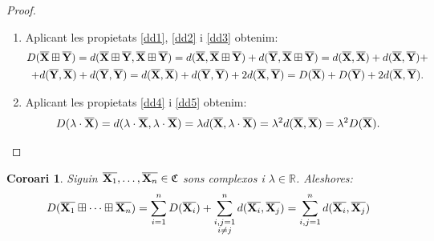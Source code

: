 \documentclass{article}
\theoremstyle{math}
\newtheorem{corollary}[definition]{Coro\lgem ari}
\newcommand{\0}{\ensuremath{\vb{0}}}
\newcommand{\X}{\ensuremath{\vb{X}}}
\newcommand{\Y}{\ensuremath{\vb{Y}}}
\newcommand{\RR}{\ensuremath{\mathbb{R}}} %
\begin{document}
\begin{proof}
    \hfill
    \begin{enumerate}[label=$D$\arabic*)]
        \item Aplicant les propietats \ref{dd1}, \ref{dd2} i \ref{dd3} obtenim:
        \begin{multline*}
            D(\overline{\X}\boxplus\overline{\Y})=d(\overline{\X}\boxplus\overline{\Y},\overline{\X}\boxplus\overline{\Y})=d(\overline{\X},\overline{\X}\boxplus\overline{\Y})+d(\overline{\Y},\overline{\X}\boxplus\overline{\Y})=d(\overline{\X},\overline{\X})+d(\overline{\X},\overline{\Y})+\\+d(\overline{\Y},\overline{\X})+d(\overline{\Y},\overline{\Y})=d(\overline{\X},\overline{\X})+d(\overline{\Y},\overline{\Y})+2d(\overline{\X},\overline{\Y})=D(\overline{\X})+D(\overline{\Y})+2d(\overline{\X},\overline{\Y}).
        \end{multline*}
        \item Aplicant les propietats \ref{dd4} i \ref{dd5} obtenim: $$D(\lambda\cdot\overline{\X})=d(\lambda\cdot\overline{\X},\lambda\cdot\overline{\X})=\lambda d(\overline{\X},\lambda\cdot\overline{\X})=\lambda^2d(\overline{\X},\overline{\X})=\lambda^2D(\overline{\X}).$$
    \end{enumerate}
\end{proof}
\begin{corollary}
    Siguin $\overline{\X_1},\ldots,\overline{\X_n}\in\mathfrak{C}$ sons complexos i $\lambda\in\RR$. Aleshores: $$D(\overline{\X_1}\boxplus\cdots\boxplus\overline{\X_n})=\sum_{i=1}^nD(\overline{\X_i})+\sum_{\substack{i,j=1\\i\ne j}}^nd(\overline{\X_i},\overline{\X_j})=\sum_{i,j=1}^nd(\overline{\X_i},\overline{\X_j})$$
\end{corollary}
\end{document}
